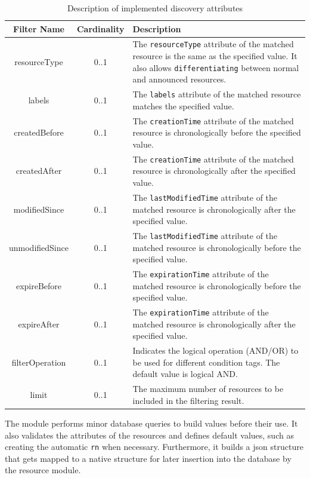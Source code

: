 \documentclass[a4paper,fleqn]{cas-dc}
\begin{document}
\begin{table}[ht]
\scriptsize
\centering
\caption{Description of implemented discovery attributes}
\label{tab:discovery_attributes}
\begin{tabular}{c c p{4cm}}
\hline
\textbf{Filter Name} & \textbf{Cardinality} & \textbf{Description} \\
\hline \hline
resourceType & 0..1 & The \texttt{resourceType} attribute of the matched resource is the same as the specified value. It also allows \texttt{differentiating} between normal and announced resources. \\
labels & 0..1 & The \texttt{labels} attribute of the matched resource matches the specified value. \\
createdBefore & 0..1 & The \texttt{creationTime} attribute of the matched resource is chronologically before the specified value. \\
createdAfter & 0..1 & The \texttt{creationTime} attribute of the matched resource is chronologically after the specified value. \\
modifiedSince & 0..1 & The \texttt{lastModifiedTime} attribute of the matched resource is chronologically after the specified value. \\
unmodifiedSince & 0..1 & The \texttt{lastModifiedTime} attribute of the matched resource is chronologically before the specified value. \\
expireBefore & 0..1 & The \texttt{expirationTime} attribute of the matched resource is chronologically before the specified value. \\
expireAfter & 0..1 & The \texttt{expirationTime} attribute of the matched resource is chronologically after the specified value. \\
filterOperation & 0..1 & Indicates the logical operation (AND/OR) to be used for different condition tags. The default value is logical AND. \\
limit & 0..1 & The maximum number of resources to be included in the filtering result. \\
\hline
\end{tabular}
\end{table}

The module performs minor database queries to build values before their use. It also validates the attributes of the resources and defines default values, such as creating the automatic \texttt{rn} when necessary. Furthermore, it builds a \gls{json} structure that gets mapped to a native structure for later insertion into the database by the resource module.
\end{document}
